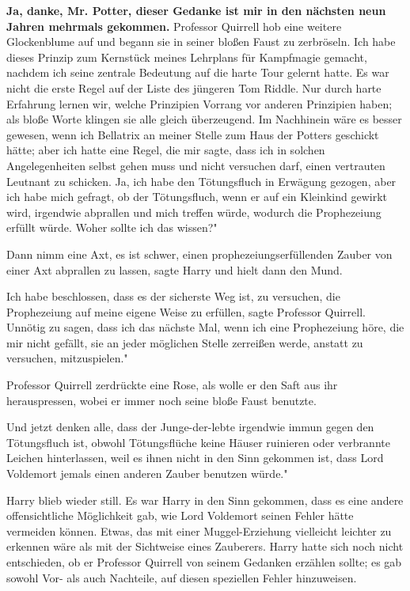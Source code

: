 \glqq \textbf{Ja, danke, Mr. Potter, dieser Gedanke ist mir in den nächsten neun
Jahren mehrmals gekommen.}\grqq{} Professor Quirrell hob eine weitere
Glockenblume auf und begann sie in seiner bloßen Faust zu zerbröseln. \glqq Ich
habe dieses Prinzip zum Kernstück meines Lehrplans für Kampfmagie gemacht,
nachdem ich seine zentrale Bedeutung auf die harte Tour gelernt hatte. Es war
nicht die erste Regel auf der Liste des jüngeren Tom Riddle. Nur durch harte
Erfahrung lernen wir, welche Prinzipien Vorrang vor anderen Prinzipien haben;
als bloße Worte klingen sie alle gleich überzeugend. Im Nachhinein wäre es
besser gewesen, wenn ich Bellatrix an meiner Stelle zum Haus der Potters
geschickt hätte; aber ich hatte eine Regel, die mir sagte, dass ich in solchen
Angelegenheiten selbst gehen muss und nicht versuchen darf, einen vertrauten
Leutnant zu schicken. Ja, ich habe den Tötungsfluch in Erwägung gezogen, aber
ich habe mich gefragt, ob der Tötungsfluch, wenn er auf ein Kleinkind gewirkt
wird, irgendwie abprallen und mich treffen würde, wodurch die Prophezeiung
erfüllt würde. Woher sollte ich das wissen?"

\glqq Dann nimm eine Axt, es ist schwer, einen prophezeiungserfüllenden Zauber
von einer Axt abprallen zu lassen\grqq{}, sagte Harry und hielt dann den Mund.

\glqq Ich habe beschlossen, dass es der sicherste Weg ist, zu versuchen, die
Prophezeiung auf meine eigene Weise zu erfüllen\grqq{}, sagte Professor
Quirrell. \glqq Unnötig zu sagen, dass ich das nächste Mal, wenn ich eine
Prophezeiung höre, die mir nicht gefällt, sie an jeder möglichen Stelle
zerreißen werde, anstatt zu versuchen, mitzuspielen."

Professor Quirrell zerdrückte eine Rose, als wolle er den Saft aus ihr
herauspressen, wobei er immer noch seine bloße Faust benutzte.

\glqq Und jetzt denken alle, dass der Junge-der-lebte irgendwie immun gegen den
Tötungsfluch ist, obwohl Tötungsflüche keine Häuser ruinieren oder verbrannte
Leichen hinterlassen, weil es ihnen nicht in den Sinn gekommen ist, dass Lord
Voldemort jemals einen anderen Zauber benutzen würde."

Harry blieb wieder still. Es war Harry in den Sinn gekommen, dass es eine andere
offensichtliche Möglichkeit gab, wie Lord Voldemort seinen Fehler hätte
vermeiden können. Etwas, das mit einer Muggel-Erziehung vielleicht leichter zu
erkennen wäre als mit der Sichtweise eines Zauberers. Harry hatte sich noch
nicht entschieden, ob er Professor Quirrell von seinem Gedanken erzählen sollte;
es gab sowohl Vor- als auch Nachteile, auf diesen speziellen Fehler hinzuweisen.

